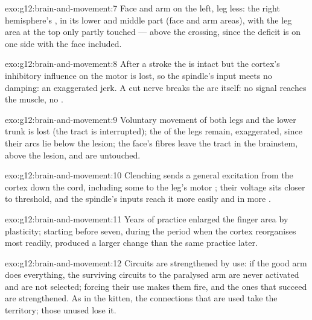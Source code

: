 \begin{solution}{exo:g12:brain-and-movement:7}
Face and arm on the left, leg less: the right hemisphere's , in its lower and middle part (face and arm areas), with the
leg area at the top only partly touched --- above the crossing, since
the deficit is on one side with the face included.
\end{solution}

\begin{solution}{exo:g12:brain-and-movement:8}
After a stroke the  is intact but the cortex's inhibitory
influence on the motor  is lost, so the spindle's input meets
no damping: an exaggerated jerk. A cut nerve breaks the arc itself:
no signal reaches the muscle, no .
\end{solution}

\begin{solution}{exo:g12:brain-and-movement:9}
Voluntary movement of both legs and the lower trunk is lost (the
tract is interrupted); the  of the legs remain, exaggerated,
since their arcs lie below the lesion; the face's fibres leave the
tract in the brainstem, above the lesion, and are untouched.
\end{solution}

\begin{solution}{exo:g12:brain-and-movement:10}
Clenching sends a general excitation from the cortex down the cord,
including some to the leg's motor ; their voltage sits closer to
threshold, and the spindle's inputs reach it more easily and in more
.
\end{solution}

\begin{solution}{exo:g12:brain-and-movement:11}
Years of practice enlarged the finger area by plasticity; starting
before seven, during the period when the cortex reorganises most
readily, produced a larger change than the same practice later.
\end{solution}

\begin{solution}{exo:g12:brain-and-movement:12}
Circuits are strengthened by use: if the good arm does everything,
the surviving circuits to the paralysed arm are never activated and
are not selected; forcing their use makes them fire, and the ones that
succeed are strengthened. As in the kitten, the connections that are
used take the territory; those unused lose it.
\end{solution}

